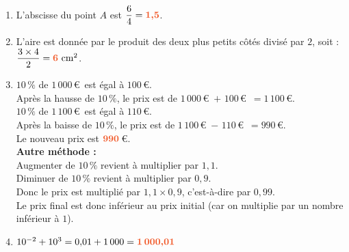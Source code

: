 \documentclass[a4paper,11pt]{article}
\begin{document}
{\begin{seanceD}{}
\begin{enumerate}
	\item L'abscisse du point $A$ est $\dfrac{6}{4}={\color[HTML]{f15929}\boldsymbol{1{,}5}}$.
	\item L'aire est donnée par le produit des deux plus petits côtés divisé par $2$, soit : $\dfrac{3\times 4}{2}={\color[HTML]{f15929}\boldsymbol{6}}\text{ cm}^2$.
	\item  $10\,\%$ de  $1\,000$\,\euro{}~est égal à $100$\,\euro{}. \\
        Après la hausse de $10\,\%$, le prix est de $1\,000$\,\euro{}~$+$ $100$\,\euro{}~$=1\,100$\,\euro{}.\\
        $10\,\%$ de  $1\,100$\,\euro{}~est égal à $110$\,\euro{}. \\
        Après la baisse de $10\,\%$, le prix est de  $1\,100$\,\euro{}~$-$ $110$\,\euro{}~$=990$\,\euro{}.\\
        Le nouveau prix est ${\color[HTML]{f15929}\boldsymbol{990}}$\,\euro{}. \\
        \textbf{Autre méthode :\\ }
        Augmenter de $10\,\%$ revient à multiplier par $1{,}1$.\\
Diminuer de $10\,\%$ revient à multiplier par $0{,}9$.\\
Donc le prix est multiplié par $1{,}1\times 0{,}9$, c'est-à-dire par $0{,}99$.\\
Le prix final est donc inférieur au prix initial (car on multiplie par un nombre inférieur à $1$).
        
	\item $
      10^{-2}+10^{3}=0{,}01 +1\,000
      ={\color[HTML]{f15929}\boldsymbol{1\,000{,}01}}$

\end{enumerate}


\end{seanceD}
}{}
\end{document}
